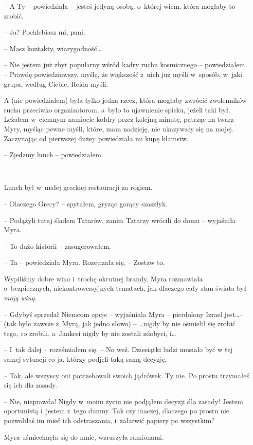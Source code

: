 \documentclass[oneside,polish,11pt,sfheadings]{mwbk}
\begin{document}
-- A Ty -- powiedziała -- jesteś jedyną osobą, o~której wiem, która mogłaby
to zrobić.

-- Ja? Pochlebiasz mi, pani.

-- Masz kontakty, wiarygodność\ldots

-- Nie jestem już zbyt popularny wśród kadry ruchu kosmicznego -- powiedziałem. -- Prawdę powiedziawszy, myślę, że większość z~nich już
myśli w~sposób, w~jaki grupa, według Ciebie, Reida myśli.

A (nie powiedziałem) była tylko jedna rzecz, która mogłaby zwrócić
zwolenników ruchu przeciwko organizatorom, a~było to ujawnienie spisku,
jeżeli taki był. Leżałem w~ciemnym namiocie kołdry przez kolejną minutę,
patrząc na twarz Myry, myśląc pewne myśli, które, mam nadzieję, nie
ukazywały się na mojej. Zaczynając od pierwszej dużej: powiedziała mi
kupę kłamstw.

-- Zjedzmy lunch -- powiedziałem.

~

Lunch był w~małej greckiej restauracji za rogiem.

-- Dlaczego Grecy? -- spytałem, gryząc gorący szaszłyk.

-- Podążyli tutaj śladem Tatarów, zanim Tatarzy wrócili do domu -- wyjaśniła Myra.

-- To dużo historii -- zasugerowałem.

-- Ta -- powiedziała Myra. Rozejrzała się. -- Zostaw to.

Wypiliśmy dobre wino i~trochę okrutnej brandy. Myra rozmawiała o~bezpiecznych, niekontrowersyjnych tematach, jak dlaczego cały stan
świata był \emph{moją winą}.

-- Gdybyś sprzedał Niemcom opcje -- wyjaśniała Myra -- pierdolony Izrael
jest\ldots -- (tak było zawsze z~Myrą, jak jedno słowo) -- \ldots nigdy by nie
ośmielił się zrobić tego, co zrobili, a~Jankesi nigdy by nie zostali
zdobyci, i\ldots

-- I~tak dalej -- roześmiałem się. -- No weź. Dziesiątki ludzi musiało być
w tej samej sytuacji co ja, którzy podjęli taką samą decyzję.

-- Tak, ale wszyscy oni potrzebowali swoich jądrówek. Ty nie. Po prostu
trzymałeś się ich dla zasady.

-- Nie, nieprawda! Nigdy w~moim życiu nie podjąłem decyzji dla zasady!
Jestem oportunistą i~jestem z~tego dumny. Tak czy inaczej, dlaczego po
prostu nie pozwoliłaś im mieć ich odstraszania, i~załatwić papiery po
wszystkim?

Myra uśmiechnęła się do mnie, wzruszyła ramionami.
\end{document}
